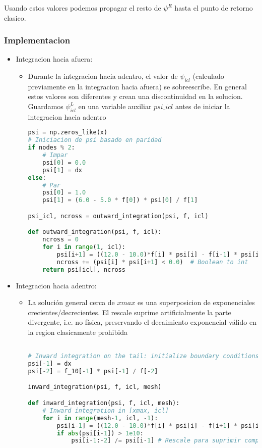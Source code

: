 \documentclass[11pt]{article}
\begin{document}
Usando estos valores podemos propagar el resto de \(\psi^R\) hasta el punto de retorno clasico.
\subsubsection{Implementacion}
\label{sec:orgc65af15}

\begin{itemize}
\item Integracion hacia afuera:

\begin{itemize}
\item Durante la integracion hacia adentro, el valor de \(\psi_{icl}\) (calculado previamente en la integracion hacia afuera) se sobreescribe. En general estos valores son diferentes y crean una discontinuidad en la solucion. Guardamos \(\psi^L_{icl}\) en una variable auxiliar \(psi\_icl\) antes de iniciar la integracion hacia adentro

\begin{lstlisting}[language=Python,numbers=none]
psi = np.zeros_like(x)
# Iniciacion de psi basado en paridad
if nodes % 2:
    # Impar
    psi[0] = 0.0
    psi[1] = dx
else:
    # Par
    psi[0] = 1.0
    psi[1] = (6.0 - 5.0 * f[0]) * psi[0] / f[1]

psi_icl, ncross = outward_integration(psi, f, icl)

def outward_integration(psi, f, icl):
    ncross = 0
    for i in range(1, icl):
        psi[i+1] = ((12.0 - 10.0)*f[i] * psi[i] - f[i-1] * psi[i-1]) / f[i+1]
        ncross += (psi[i] * psi[i+1] < 0.0)  # Boolean to int
    return psi[icl], ncross

\end{lstlisting}
\end{itemize}

\item Integracion hacia adentro:

\begin{itemize}
\item La solución general cerca de \(xmax\) es una superposicion de exponenciales crecientes/decrecientes. El rescale suprime artificialmente la parte divergente, i.e. no física, preservando el decaimiento exponencial válido en la region clasicamente prohibida

\begin{lstlisting}[language=Python,numbers=none]

# Inward integration on the tail: initialize boundary conditions.
psi[-1] = dx
psi[-2] = f_10[-1] * psi[-1] / f[-2]

inward_integration(psi, f, icl, mesh)

def inward_integration(psi, f, icl, mesh):
    # Inward integration in [xmax, icl]
    for i in range(mesh-1, icl, -1):
        psi[i-1] = ((12.0 - 10.0)*f[i] * psi[i] - f[i+1] * psi[i+1]) / f[i-1]
        if abs(psi[i-1]) > 1e10:
            psi[i-1:-2] /= psi[i-1] # Rescale para suprimir comportamiento divergente

\end{lstlisting}
\end{itemize}
\end{itemize}
\end{document}
